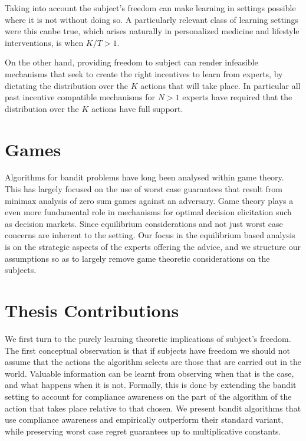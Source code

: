 Taking into account the subject's freedom can make learning in settings possible where it is not without doing so.
A particularly relevant class of learning settings were this canbe true, which arises naturally in personalized medicine and lifestyle interventions, is when $K/T > 1$.

On the other hand, providing freedom to subject can render infeasible mechanisms that seek to create the right incentives to learn from experts, by dictating the distribution over the $K$ actions that will take place.
In particular all past incentive compatible mechanisms for $N>1$ experts have required that the distribution over the $K$ actions have full support.


\section{Games}

Algorithms for bandit problems have long been analysed within game theory.
This has largely focused on the use of worst case guarantees that result from minimax analysis of zero sum games against an adversary.
Game theory plays a even more fundamental role in mechanisms for optimal decision elicitation such as decision markets. 
Since equilibrium considerations and not just worst case concerns are inherent to the setting.
Our focus in the equilibrium based analysis is on the strategic aspects of the experts offering the advice, and we structure our assumptions so as to largely remove game theoretic considerations on the subjects.

\section{Thesis Contributions}

We first turn to the purely learning theoretic implications of subject's freedom.
The first conceptual observation is that if subjects have freedom we should not assume that the actions the algorithm selects are those that are carried out in the world. Valuable information can be learnt from observing when that is the case, and what happens when it is not.
Formally, this is done by extending the bandit setting to account for compliance awareness on the part of the algorithm of the action that takes place relative to that chosen.
We present bandit algorithms that use compliance awareness and empirically outperform their standard variant, while preserving worst case regret guarantees up to multiplicative constants. 

